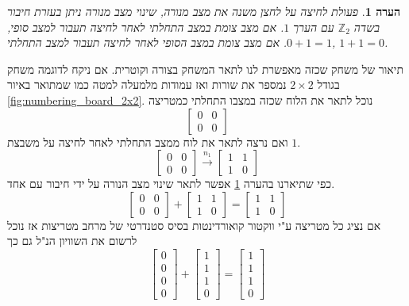 \documentclass[12pt,leqno]{article}
\newtheorem{comm}{הערה}[section]
\begin{document}
\begin{comm}
    \label{comm: sum as press operator on board}
    פעולת לחיצה על לחצן משנה 
    את מצב מנורה,
    שינוי מצב מנורה ניתן 
    בעזרת חיבור 
    בשדה 
    $\mathbb{Z}_2$
    עם הערך 
    $1$.
    אם מצב צומת במצב התחלתי לאחר לחיצה 
    תעבור למצב 
    סופי,
    $0+1=1$.
    אם מצב צומת במצב הסופי לאחר לחיצה 
    תעבור למצב 
    התחלתי,
    $1+1=0$.
\end{comm}
תיאור של משחק שכזה מאפשרת לנו
לתאר המשחק בצורה וקוטרית.
אם ניקח לדוגמה
משחק בגודל
$2 \times 2$
נמספר את 
שורות ואז עמודות מלמעלה למטה כמו שמתואר באיור
\ref{fig:numbering_board_2x2}.
נוכל לתאר את הלוח 
שכזה במצבו התחלתי כמטריצה
\[\begin{bmatrix}
0 & 0 \\
0 & 0 
\end{bmatrix}\]
ואם נרצה לתאר את לוח ממצב התחלתי לאחר לחיצה על משבצת 
$1$.
\[ 
    \begin{bmatrix}
    0 & 0 \\
    0 & 0 
    \end{bmatrix} \stackrel{n_1}{\longrightarrow}
    \begin{bmatrix}
    1 & 1 \\
    1 & 0 
    \end{bmatrix}
 \]
 כפי שתיארנו 
 בהערה 
 \ref{comm: sum as press operator on board}
 אפשר לתאר שינוי מצב הנורה על ידי חיבור 
 עם אחד.
\[
    \begin{bmatrix}
    0 & 0 \\
    0 & 0 
    \end{bmatrix} + 
    \begin{bmatrix}
    1 & 1 \\
    1 & 0 
    \end{bmatrix}=
    \begin{bmatrix}
    1 & 1 \\
    1 & 0 
    \end{bmatrix} 
\]  
 אם נציג כל מטריצה ע"י ווקטור קואורדינטות בסיס סטנדרטי של מרחב מטריצות אז נוכל לרשום את השוויון הנ"ל גם כך
 \[ 
    \begin{bmatrix} 
    0 \\ 0 \\ 0 \\ 0
    \end{bmatrix} +  \begin{bmatrix} 
    1 \\ 1 \\ 1 \\ 0
    \end{bmatrix} =  \begin{bmatrix} 
    1 \\ 1 \\ 1 \\ 0
    \end{bmatrix}  
 \]
\end{document}

